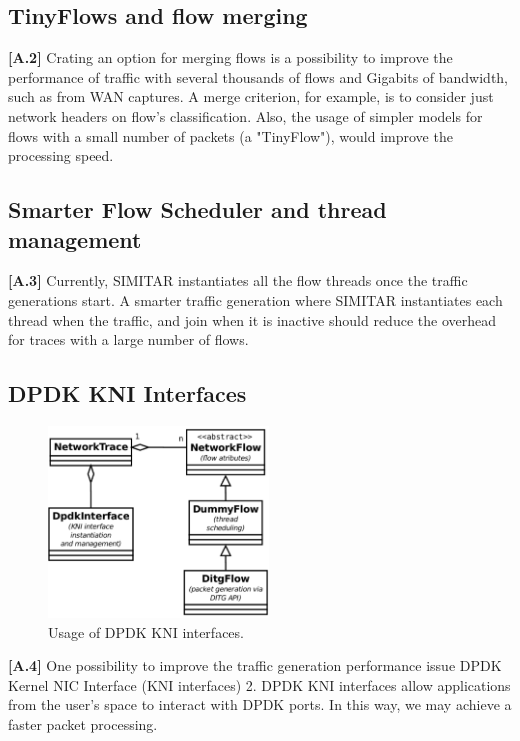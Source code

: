 \subsection{TinyFlows and flow merging}

\textbf{[A.2]} Crating an option for merging flows is a possibility to improve the performance of traffic with several thousands of flows and Gigabits of bandwidth, such as from WAN captures. A merge criterion, for example, is to consider just network headers on flow’s classification. Also, the usage of simpler models for flows with a small number of packets (a "TinyFlow"), would improve the processing speed.

\subsection{Smarter Flow Scheduler and thread management}

\textbf{[A.3]} Currently, SIMITAR instantiates all the flow threads once the traffic generations start.  A smarter traffic generation where SIMITAR instantiates each thread when the traffic, and join when it is inactive should reduce the overhead for traces with a large number of flows. 

\subsection{DPDK KNI Interfaces}

\begin{figure}[!ht]
    \centering
    \includegraphics[height=2.0in]{figures/ch6/dpdk-interface.pdf}
    \caption{Usage of DPDK KNI interfaces.}
    \label{fig:dpdk-kni}
\end{figure}

\textbf{[A.4]} One possibility to improve the traffic generation performance issue DPDK Kernel NIC Interface (\acrfull{KNI} interfaces) 2. DPDK KNI interfaces allow applications from the user’s space to interact with DPDK ports. In this way, we may achieve a faster packet processing.

